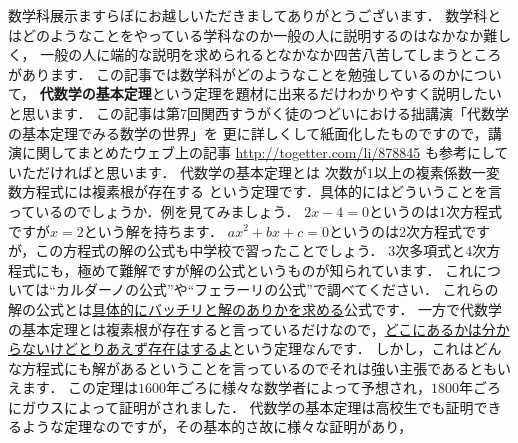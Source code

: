 


数学科展示ますらぼにお越しいただきましてありがとうございます．
数学科とはどのようなことをやっている学科なのか一般の人に説明するのはなかなか難しく，
一般の人に端的な説明を求められるとなかなか四苦八苦してしまうところがあります．
この記事では数学科がどのようなことを勉強しているのかについて，
\textbf{代数学の基本定理}という定理を題材に出来るだけわかりやすく説明したいと思います．
この記事は第7回関西すうがく徒のつどいにおける拙講演「代数学の基本定理でみる数学の世界」を
更に詳しくして紙面化したものですので，講演に関してまとめたウェブ上の記事 \url{http://togetter.com/li/878845} も参考にしていただければと思います．
代数学の基本定理とは
\thm
次数が$1$以上の複素係数一変数方程式には複素根が存在する
\thmx
という定理です．具体的にはどういうことを言っているのでしょうか．例を見てみましょう．
\ex
$2x-4=0$というのは$1$次方程式ですが$x=2$という解を持ちます．
\exx
\ex
$ax^2+bx+c=0$というのは$2$次方程式ですが，この方程式の解の公式も中学校で習ったことでしょう．
\exx
\ex
$3$次多項式と$4$次方程式にも，極めて難解ですが解の公式というものが知られています．
これについては``カルダーノの公式''や``フェラーリの公式''で調べてください．
\exx
これらの解の公式とは\underline{具体的にバッチリと解のありかを求める}公式です．
一方で代数学の基本定理とは複素根が存在すると言っているだけなので，\underline{どこにあるかは分からないけど}\underline{とりあえず存在はするよ}という定理なんです．
しかし，これはどんな方程式にも解があるということを言っているのでそれは強い主張であるともいえます．
この定理は$1600$年ごろに様々な数学者によって予想され，$1800$年ごろにガウスによって証明がされました．
代数学の基本定理は高校生でも証明できるような定理なのですが，その基本的さ故に様々な証明があり，

